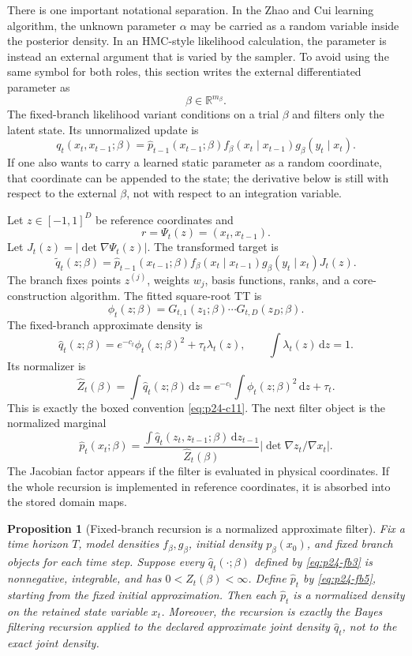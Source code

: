 \documentclass[11pt]{article}
\newtheorem{proposition}{Proposition}
\newcommand{\R}{\mathbb R}
\newcommand{\dd}{\,\mathrm d}
\begin{document}
There is one important notational separation.  In the Zhao and Cui \cite{zhao2024ttsequential} learning
algorithm, the unknown parameter \(\alpha\) may be carried as a random variable
inside the posterior density.  In an HMC-style likelihood calculation, the
parameter is instead an external argument that is varied by the sampler.  To
avoid using the same symbol for both roles, this section writes the external
differentiated parameter as
\[
    \beta\in\R^{m_\beta}.
\]
The fixed-branch likelihood variant conditions on a trial \(\beta\) and filters
only the latent state.  Its unnormalized update is
\[
    q_t(x_t,x_{t-1};\beta)
    =
    \widehat p_{t-1}(x_{t-1};\beta)
    f_\beta(x_t\mid x_{t-1})
    g_\beta(y_t\mid x_t).
\]
If one also wants to carry a learned static parameter as a random coordinate,
that coordinate can be appended to the state; the derivative below is still
with respect to the external \(\beta\), not with respect to an integration
variable.

Let \(z\in[-1,1]^D\) be reference coordinates and
\[
    r=\Psi_t(z)=(x_t,x_{t-1}).
\]
Let \(J_t(z)=|\det\nabla\Psi_t(z)|\).  The transformed target is
\[
    \widetilde q_t(z;\beta)
    =
    \widehat p_{t-1}(x_{t-1};\beta)
    f_\beta(x_t\mid x_{t-1})
    g_\beta(y_t\mid x_t)
    J_t(z).
    \label{eq:p24-fb1}
\]
The branch fixes points \(z^{(j)}\), weights \(w_j\), basis functions, ranks,
and a core-construction algorithm.  The fitted square-root TT is
\[
    \phi_t(z;\beta)=G_{t,1}(z_1;\beta)\cdots G_{t,D}(z_D;\beta).
    \label{eq:p24-fb2}
\]
The fixed-branch approximate density is
\[
    \widehat q_t(z;\beta)
    =
    e^{-c_t}\phi_t(z;\beta)^2+\tau_t\lambda_t(z),
    \qquad
    \int\lambda_t(z)\dd z=1.
    \label{eq:p24-fb3}
\]
Its normalizer is
\[
    \widehat Z_t(\beta)
    =
    \int\widehat q_t(z;\beta)\dd z
    =
    e^{-c_t}\int\phi_t(z;\beta)^2\dd z+\tau_t.
    \label{eq:p24-fb4}
\]
This is exactly the boxed convention \eqref{eq:p24-c11}.
The next filter object is the normalized marginal
\[
    \widehat p_t(x_t;\beta)
    =
    \frac{
    \int \widehat q_t(z_t,z_{t-1};\beta)\dd z_{t-1}}
    {\widehat Z_t(\beta)}
    \left|\det\nabla z_t/\nabla x_t\right|.
    \label{eq:p24-fb5}
\]
The Jacobian factor appears if the filter is evaluated in physical coordinates.
If the whole recursion is implemented in reference coordinates, it is absorbed
into the stored domain maps.

\begin{proposition}[Fixed-branch recursion is a normalized approximate filter]
Fix a time horizon \(T\), model densities \(f_\beta,g_\beta\), initial density
\(p_\beta(x_0)\), and fixed branch objects for each time step.  Suppose every
\(\widehat q_t(\cdot;\beta)\) defined by \eqref{eq:p24-fb3} is nonnegative, integrable, and
has \(0<\widehat Z_t(\beta)<\infty\).  Define \(\widehat p_t\) by \eqref{eq:p24-fb5},
starting from the fixed initial approximation.  Then each \(\widehat p_t\) is a
normalized density on the retained state variable \(x_t\).  Moreover, the
recursion is exactly the Bayes filtering recursion applied to the declared
approximate joint density \(\widehat q_t\), not to the exact joint density.
\end{proposition}
\end{document}
